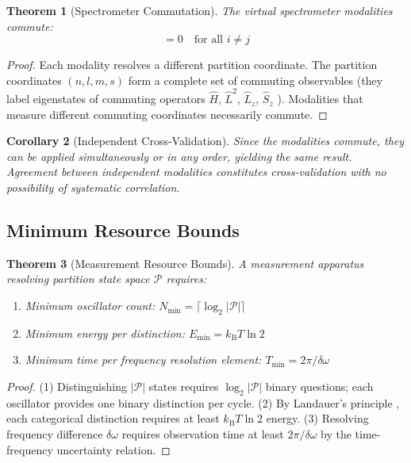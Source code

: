 \documentclass[11pt,twocolumn,a4paper]{article}
\newtheorem{theorem}{Theorem}[section]
\newtheorem{corollary}[theorem]{Corollary}
\theoremstyle{definition}
\theoremstyle{remark}
\newcommand{\kB}{k_{\mathrm{B}}}
\begin{document}
\begin{theorem}[Spectrometer Commutation]
\label{thm:spectrometer_commute}
The virtual spectrometer modalities commute:
\begin{equation}
[\hat{O}_{\mathrm{mod}}^{(i)}, \hat{O}_{\mathrm{mod}}^{(j)}] = 0 \quad \text{for all } i \neq j
\end{equation}
\end{theorem}

\begin{proof}
Each modality resolves a different partition coordinate. The partition coordinates $(n, l, m, s)$ form a complete set of commuting observables (they label eigenstates of commuting operators $\hat{H}$, $\hat{L}^2$, $\hat{L}_z$, $\hat{S}_z$ \citep{griffiths2018}). Modalities that measure different commuting coordinates necessarily commute.
\end{proof}

\begin{corollary}[Independent Cross-Validation]
Since the modalities commute, they can be applied simultaneously or in any order, yielding the same result. Agreement between independent modalities constitutes cross-validation with no possibility of systematic correlation.
\end{corollary}

\subsection{Minimum Resource Bounds}

\begin{theorem}[Measurement Resource Bounds]
\label{thm:bounds}
A measurement apparatus resolving partition state space $\mathcal{P}$ requires:
\begin{enumerate}
\item Minimum oscillator count: $N_{\min} = \lceil \log_2 |\mathcal{P}| \rceil$
\item Minimum energy per distinction: $E_{\min} = \kB T \ln 2$ \citep{landauer1961}
\item Minimum time per frequency resolution element: $T_{\min} = 2\pi / \delta\omega$
\end{enumerate}
\end{theorem}

\begin{proof}
(1) Distinguishing $|\mathcal{P}|$ states requires $\log_2 |\mathcal{P}|$ binary questions; each oscillator provides one binary distinction per cycle.
(2) By Landauer's principle \citep{landauer1961}, each categorical distinction requires at least $\kB T \ln 2$ energy.
(3) Resolving frequency difference $\delta\omega$ requires observation time at least $2\pi/\delta\omega$ by the time-frequency uncertainty relation.
\end{proof}
\end{document}
